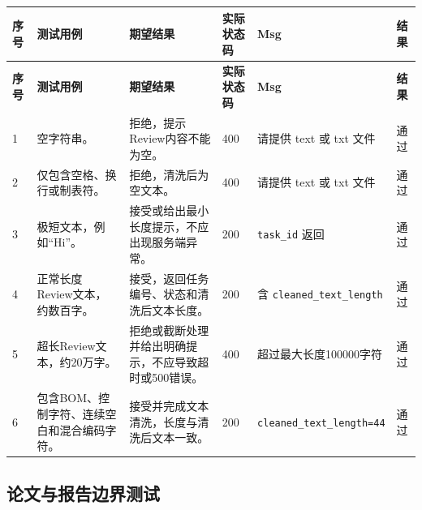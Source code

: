 \documentclass[UTF8,a4paper,12pt]{ctexart}
\newcommand{\pass}{通过}
\begin{document}
\begin{longtable}{|P{0.8cm}|P{4.2cm}|P{4.0cm}|P{1.4cm}|P{4.3cm}|P{1.0cm}|}
\hline
\textbf{序号} & \textbf{测试用例} & \textbf{期望结果} & \textbf{实际状态码} & \textbf{Msg} & \textbf{结果} \\
\hline
\endfirsthead

\hline
\textbf{序号} & \textbf{测试用例} & \textbf{期望结果} & \textbf{实际状态码} & \textbf{Msg} & \textbf{结果} \\
\hline
\endhead

1 & 空字符串。 & 拒绝，提示Review内容不能为空。 & 400 & 请提供 text 或 txt 文件 & \pass \\
\hline

2 & 仅包含空格、换行或制表符。 & 拒绝，清洗后为空文本。 & 400 & 请提供 text 或 txt 文件 & \pass \\
\hline

3 & 极短文本，例如“Hi”。 & 接受或给出最小长度提示，不应出现服务端异常。 & 200 & \texttt{task\_id} 返回 & \pass \\
\hline

4 & 正常长度Review文本，约数百字。 & 接受，返回任务编号、状态和清洗后文本长度。 & 200 & 含 \texttt{cleaned\_text\_length} & \pass \\
\hline

5 & 超长Review文本，约20万字。 & 拒绝或截断处理并给出明确提示，不应导致超时或500错误。 & 400 & 超过最大长度100000字符 & \pass \\
\hline

6 & 包含BOM、控制字符、连续空白和混合编码字符。 & 接受并完成文本清洗，长度与清洗后文本一致。 & 200 & \texttt{cleaned\_text\_length=44} & \pass \\
\hline

\end{longtable}

\subsection{论文与报告边界测试}
\end{document}
